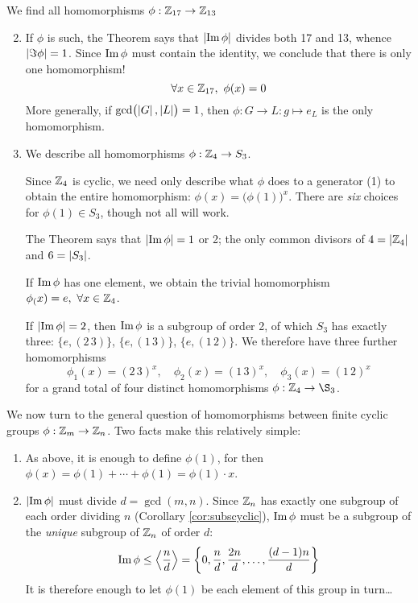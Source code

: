 \goodbreak


\begin{examples}{}{}
	\exstart We find all homomorphisms $\phi:\mathbb{Z}_{17}\to\mathbb{Z}_{13}$\vspace{-5pt}
	\begin{enumerate}\setcounter{enumi}{1}
	  \item[]If $\phi$ is such, the Theorem says that $\left| \operatorname{Im}\phi\right|$ divides both 17 and 13, whence $\left| \Im\phi\right|=1$. Since $\operatorname{Im}\phi$ must contain the identity, we conclude that there is only one homomorphism!
	  \[
	  	\forall x\in\mathbb{Z}_{17},\ \phi(x)=0
	  \]
	  More generally, if $\gcd\bigl(\left| G\right|,\left| L\right|\bigr)=1$, then $\phi:G\to L:g\mapsto e_L$ is the only homomorphism.
	  
	  \item We describe all homomorphisms $\phi:\mathbb{Z}_4\to S_3$.\par
	  Since $\mathbb{Z}_4$ is cyclic, we need only describe what $\phi$ does to a generator (1) to obtain the entire homomorphism: $\phi(x)=\bigl(\phi(1)\bigr)^x$. There are \emph{six} choices for $\phi(1)\in S_3$, though not all will work.\par
	  The Theorem says that $\left| \operatorname{Im}\phi\right|=1$ or 2; the only common divisors of $4=\left| \mathbb{Z}_4\right|$ and $6=\left| S_3\right|$.\par
	  If $\operatorname{Im}\phi$ has one element, we obtain the trivial homomorphism $\phi_(x)=e,\ \forall x\in\Z_4$.\par
	  If $\left| \operatorname{Im}\phi\right|=2$, then $\operatorname{Im}\phi$ is a subgroup of order 2, of which $S_3$ has exactly three: $\{e,(2\,3)\}$, $\{e,(1\,3)\}$, $\{e,(1\,2)\}$. We therefore have three further homomorphisms
	  \[
	  	\phi_1(x)=(2\,3)^x,\quad 
	  	\phi_2(x)=(1\,3)^x,\quad
	  	\phi_3(x)=(1\,2)^x
	  \]
	  for a grand total of four distinct homomorphisms $\phi:\Z_4\to\S_3$.
	\end{enumerate}
\end{examples}

We now turn to the general question of homomorphisms between finite cyclic groups $\phi:\mathbb{Z}_m\to\mathbb{Z}_n$. Two facts make this relatively simple:
\begin{enumerate}
  \item As above, it is enough to define $\phi(1)$, for then $\phi(x)=\phi(1)+\cdots+\phi(1)=\phi(1)\cdot x$.
  \item $\left| \operatorname{Im}\phi\right|$ must divide $d=\gcd(m,n)$. Since $\mathbb{Z}_n$ has exactly one subgroup of each order dividing $n$ (Corollary \ref{cor:subscyclic}), $\operatorname{Im}\phi$ must be a subgroup of the \emph{unique} subgroup of $\mathbb{Z}_n$ of order $d$:
	\[
		\operatorname{Im}\phi\le\left\langle \frac nd\right\rangle
		=\left\{0,\frac nd,\frac{2n}d,\ldots,\frac{(d-1)n}d\right\}
	\]
	It is therefore enough to let $\phi(1)$ be each element of this group in turn\ldots
\end{enumerate} 

